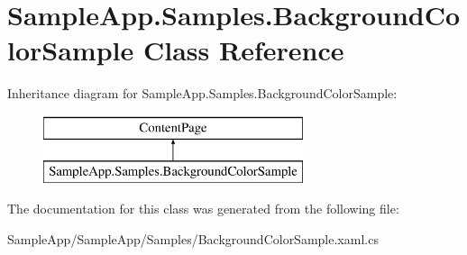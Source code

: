 \hypertarget{class_sample_app_1_1_samples_1_1_background_color_sample}{}\section{Sample\+App.\+Samples.\+Background\+Color\+Sample Class Reference}
\label{class_sample_app_1_1_samples_1_1_background_color_sample}
Inheritance diagram for Sample\+App.\+Samples.\+Background\+Color\+Sample\+:\begin{figure}[H]
\begin{center}
\leavevmode
\includegraphics[height=2.000000cm]{class_sample_app_1_1_samples_1_1_background_color_sample}
\end{center}
\end{figure}


The documentation for this class was generated from the following file\+:\begin{DoxyCompactItemize}
\item 
Sample\+App/\+Sample\+App/\+Samples/Background\+Color\+Sample.\+xaml.\+cs\end{DoxyCompactItemize}
